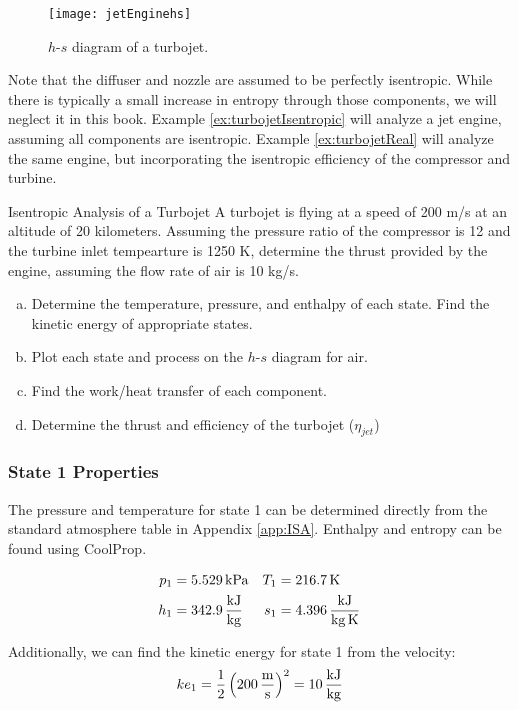 \begin{figure}[H]
  \centering
  \texttt{[image: jetEnginehs]}
  \caption{$h$-$s$ diagram of a turbojet.}
  \label{fig:turbojet_hs}
\end{figure}

Note that the diffuser and nozzle are assumed to be perfectly isentropic.  While there is typically a small increase in entropy through those components, we will neglect it in this book.  Example \ref{ex:turbojetIsentropic} will analyze a jet engine, assuming all components are isentropic. Example \ref{ex:turbojetReal} will analyze the same engine, but incorporating the isentropic efficiency of the compressor and turbine.

\begin{example}[label=ex:turbojetIsentropic]{Isentropic Analysis of a Turbojet}
  A turbojet is flying at a speed of 200 m/s at an altitude of 20 kilometers.  Assuming the pressure ratio of the compressor is 12 and the turbine inlet tempearture is 1250 K, determine the thrust provided by the engine, assuming the flow rate of air is 10 kg/s.

  \begin{enumerate}[a)]
  \item Determine the temperature, pressure, and enthalpy of each state.  Find the kinetic energy of appropriate states.
  \item Plot each state and process on the $h$-$s$ diagram for air.
  \item Find the work/heat transfer of each component.
  \item Determine the thrust and efficiency of the turbojet ($\eta_{jet}$)
  \end{enumerate}

  \subsubsection*{State 1 Properties}
  The pressure and temperature for state 1 can be determined directly from the standard atmosphere table in Appendix \ref{app:ISA}. Enthalpy and entropy can be found using CoolProp. 

  \begin{align*}
    p_1 &= 5.529 {\rm\, kPa} & T_1 &= 216.7 {\rm\, K} \\
    h_1 &= 342.9\, \frac{\rm kJ}{\rm kg} &  s_1 &= 4.396\, \frac{\rm kJ}{\rm kg\,K}
  \end{align*}
  
  Additionally, we can find the kinetic energy for state 1 from the velocity:
  \begin{equation*}
    ke_1 = \frac{1}{2} \left(200\, \frac{\rm m}{\rm s}\right)^2 = 10\, \frac{\rm kJ}{\rm kg}
  \end{equation*}


\end{example}
